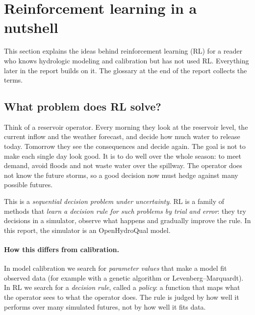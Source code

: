 \section{Reinforcement learning in a nutshell}\label{sec:primer}

This section explains the ideas behind reinforcement learning (RL) for a
reader who knows hydrologic modeling and calibration but has not used RL.
Everything later in the report builds on it. The glossary at the end of the
report collects the terms.

\subsection{What problem does RL solve?}
Think of a reservoir operator. Every morning they look at the reservoir
level, the current inflow and the weather forecast, and decide how much
water to release today. Tomorrow they see the consequences and decide
again. The goal is not to make each single day look good. It is to do well
over the whole season: to meet demand, avoid floods and not waste water
over the spillway. The operator does not know the future storms, so a good
decision now must hedge against many possible futures.

This is a \emph{sequential decision problem under uncertainty}. RL is a
family of methods that \emph{learn a decision rule for such problems by
trial and error}: they try decisions in a simulator, observe what happens
and gradually improve the rule. In this report, the simulator is an
OpenHydroQual model.

\paragraph{How this differs from calibration.} In model calibration we
search for \emph{parameter values} that make a model fit observed data
(for example with a genetic algorithm or Levenberg--Marquardt). In RL we
search for a \emph{decision rule}, called a \emph{policy}: a function that
maps what the operator sees to what the operator does. The rule is judged
by how well it performs over many simulated futures, not by how well it
fits data.

